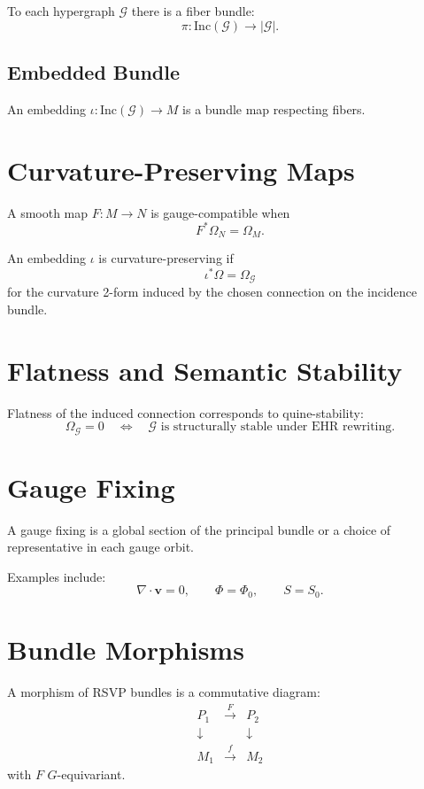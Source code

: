 To each hypergraph $\mathcal{G}$ there is a fiber bundle:
\[
\pi : \mathrm{Inc}(\mathcal{G}) \to |\mathcal{G}|.
\]

\subsection{Embedded Bundle}

An embedding $\iota : \mathrm{Inc}(\mathcal{G}) \to M$ is a bundle map respecting fibers.

\section{Curvature-Preserving Maps}

\begin{definition}
A smooth map $F : M\to N$ is gauge-compatible when
\[
F^\ast \Omega_N = \Omega_M.
\]
\end{definition}

\begin{definition}
An embedding $\iota$ is curvature-preserving if
\[
\iota^\ast \Omega = \Omega_{\mathcal{G}}
\]
for the curvature 2-form induced by the chosen connection on the incidence bundle.
\end{definition}

\section{Flatness and Semantic Stability}

Flatness of the induced connection corresponds to quine-stability:
\[
\Omega_{\mathcal{G}} = 0 \quad \Longleftrightarrow \quad \mathcal{G} \text{ is structurally stable under EHR rewriting}.
\]

\section{Gauge Fixing}

A gauge fixing is a global section of the principal bundle or a choice of representative in each gauge orbit.

Examples include:
\[
\nabla\cdot\mathbf{v} = 0, \qquad \Phi = \Phi_0, \qquad S = S_0.
\]

\section{Bundle Morphisms}

A morphism of RSVP bundles is a commutative diagram:
\[
\begin{array}{ccc}
P_1 & \xrightarrow{F} & P_2 \\
\downarrow &          & \downarrow \\
M_1 & \xrightarrow{f} & M_2
\end{array}
\]
with $F$ $G$-equivariant.

